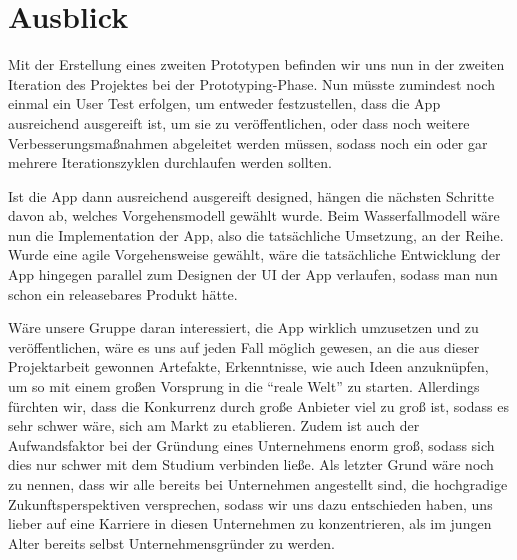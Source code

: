 
\section{Ausblick}

Mit der Erstellung eines zweiten Prototypen befinden wir uns nun in der zweiten Iteration des Projektes bei der Prototyping-Phase. Nun müsste zumindest noch einmal ein User Test erfolgen, um entweder festzustellen, dass die App ausreichend ausgereift ist, um sie zu veröffentlichen, oder dass noch weitere Verbesserungsmaßnahmen abgeleitet werden müssen, sodass noch ein oder gar mehrere Iterationszyklen durchlaufen werden sollten.

Ist die App dann ausreichend ausgereift designed, hängen die nächsten Schritte davon ab, welches Vorgehensmodell gewählt wurde. Beim Wasserfallmodell wäre nun die Implementation der App, also die tatsächliche Umsetzung, an der Reihe. Wurde eine agile Vorgehensweise gewählt, wäre die tatsächliche Entwicklung der App hingegen parallel zum Designen der UI der App verlaufen, sodass man nun schon ein releasebares Produkt hätte.

Wäre unsere Gruppe daran interessiert, die App wirklich umzusetzen und zu veröffentlichen, wäre es uns auf jeden Fall möglich gewesen, an die aus dieser Projektarbeit gewonnen Artefakte, Erkenntnisse, wie auch Ideen anzuknüpfen, um so mit einem großen Vorsprung in die \enquote{reale Welt} zu starten. Allerdings fürchten wir, dass die Konkurrenz durch große Anbieter viel zu groß ist, sodass es sehr schwer wäre, sich am Markt zu etablieren. Zudem ist auch der Aufwandsfaktor bei der Gründung eines Unternehmens enorm groß, sodass sich dies nur schwer mit dem Studium verbinden ließe. Als letzter Grund wäre noch zu nennen, dass wir alle bereits bei Unternehmen angestellt sind, die hochgradige Zukunftsperspektiven versprechen, sodass wir uns dazu entschieden haben, uns lieber auf eine Karriere in diesen Unternehmen zu konzentrieren, als im jungen Alter bereits selbst Unternehmensgründer zu werden.
